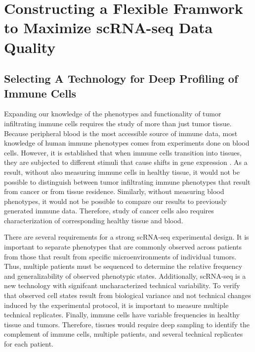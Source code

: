 \chapter[Constructing a Flexible Framwork to Maximize scRNA-seq Data Quality][Constructing a Flexible Framwork to Maximize scRNA-seq Data Quality]{Constructing a Flexible Framwork to Maximize scRNA-seq Data Quality}

\section{Selecting A Technology for Deep Profiling of Immune Cells}

Expanding our knowledge of the phenotypes and functionality of tumor infiltrating immune cells requires the study of more than just tumor tissue. 
Because peripheral blood is the most accessible source of immune data, most knowledge of human immune phenotypes comes from experiments done on blood cells. 
However, it is established that when immune cells transition into tissues, they are subjected to different stimuli that cause shifts in gene expression \citep{Fan2016}. 
As a result, without also measuring immune cells in healthy tissue, it would not be possible to distinguish between tumor infiltrating immune phenotypes that result from cancer or from tissue residence. 
Similarly, without measuring blood phenotypes, it would not be possible to compare our results to previously generated immune data. 
Therefore, study of cancer cells also requires characterization of corresponding healthy tissue and blood.

There are several requirements for a strong scRNA-seq experimental design. 
It is important to separate phenotypes that are commonly observed across patients from those that result from specific microenvironments of individual tumors. 
Thus, multiple patients must be sequenced to determine the relative frequency and generalizability of observed phenotypic states. 
Additionally, scRNA-seq is a new technology with signifcant uncharacterized technical variability. 
To verify that observed cell states result from biological variance and not technical changes induced by the experimental protocol, it is important to measure multiple technical replicates. 
Finally, immune cells have variable frequencies in healthy tissue and tumors.  %
Therefore, tissues would require deep sampling to identify the complement of immune cells, multiple patients, and several technical replicates for each patient.  

